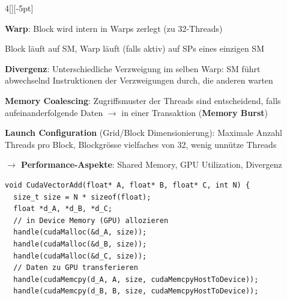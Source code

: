 \documentclass[%
	pdftex,%
	a4paper,%
	landscape,%
	ngerman,
	oneside,%
	6pt,%
	halfparskip,%
]{scrbook}
\newenvironment{tight-itemize}
{ \begin{itemize}[leftmargin=*, nosep]
    \setlength{\itemsep}{0px}
    \setlength{\parskip}{0px}
    \setlength{\parsep}{0px}  }
{ \end{itemize}                  }
\begin{document}
\begin{multicols}{4}[][-5pt]
\begin{tight-itemize}
    \item{\textbf{Warp}: Block wird intern in Warps zerlegt (zu 32-Threads)}
    \item{Block läuft auf SM, Warp läuft (falls aktiv) auf SPs eines einzigen SM}
    \item{\textbf{Divergenz}: Unterschiedliche Verzweigung im selben Warp: SM führt abwechselnd Instruktionen der Verzweigungen durch, die anderen warten}
    \item{\textbf{Memory Coalescing}: Zugriffsmuster der Threads sind entscheidend, falls aufeinanderfolgende Daten $\rightarrow$ in einer Transaktion (\textbf{Memory Burst})}
    \item{\textbf{Launch Configuration} (Grid/Block Dimensionierung): Maximale Anzahl Threads pro Block, Blockgrösse vielfaches von 32, wenig unnütze Threads}
    \item{\textbf{$\rightarrow$ Performance-Aspekte}: Shared Memory, GPU Utilization, Divergenz}
\end{tight-itemize}

\begin{lstlisting}
void CudaVectorAdd(float* A, float* B, float* C, int N) {
  size_t size = N * sizeof(float);
  float *d_A, *d_B, *d_C;
  // in Device Memory (GPU) allozieren
  handle(cudaMalloc(&d_A, size)); 
  handle(cudaMalloc(&d_B, size));
  handle(cudaMalloc(&d_C, size));
  // Daten zu GPU transferieren
  handle(cudaMemcpy(d_A, A, size, cudaMemcpyHostToDevice));
  handle(cudaMemcpy(d_B, B, size, cudaMemcpyHostToDevice));
  

\end{lstlisting}
\end{multicols}
\end{document}
